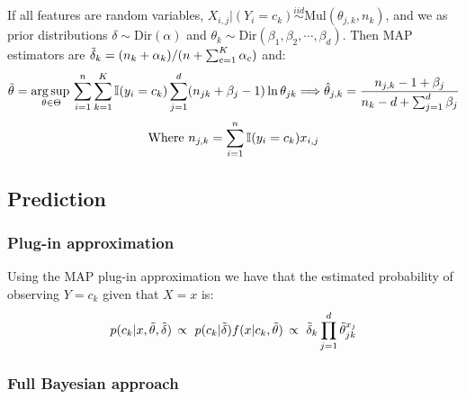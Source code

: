 If all features are  random variables, $X_{i,j}|(Y_i=c_k)\overset{iid}{\sim}\text{Mul}(\theta_{j,k},n_k)$, and we as prior distributions $\delta\sim\text{Dir}(\alpha)$ and $\theta_k\sim\text{Dir}(\beta_1,\beta_2,\cdots,\beta_d)$. Then MAP estimators are $\Tilde{\delta}_k = (n_k+\alpha_k)/(n+\sum_{c=1}^K\alpha_c)$ and:
\begin{equation*}
    \Tilde{\theta} = \operatorname*{arg\,sup\,}_{\theta\in\Theta}  \sum_{i=1}^n\sum_{k=1}^K\operatorname{\mathbb{I}}(y_i=c_k)\sum_{j=1}^d(n_{jk}+\beta_j-1)\ln \theta_{jk} \Longrightarrow \hat{\theta}_{j,k} = \frac{n_{j,k}-1+\beta_j}{n_k-d+\sum_{j=1}^d\beta_j}
\end{equation*}
\begin{equation*}
    \text{Where } n_{j,k}=\sum_{i=1}^n\operatorname{\mathbb{I}}(y_i=c_k)x_{i,j}
\end{equation*}

\subsection{Prediction}

\subsubsection*{Plug-in approximation}
Using the MAP plug-in approximation we have that the estimated probability of observing $Y=c_k$ given that $X=x$ is:
\begin{equation*}
    p(c_k|x, \Tilde{\theta},\Tilde{\delta})\, \propto\ p(c_k|\Tilde{\delta})f(x|c_k,\Tilde{\theta})\, \propto\  \Tilde{\delta}_k\prod_{j=1}^d \Tilde{\theta}_{jk}^{x_j}
\end{equation*}


\subsubsection*{Full Bayesian approach}

